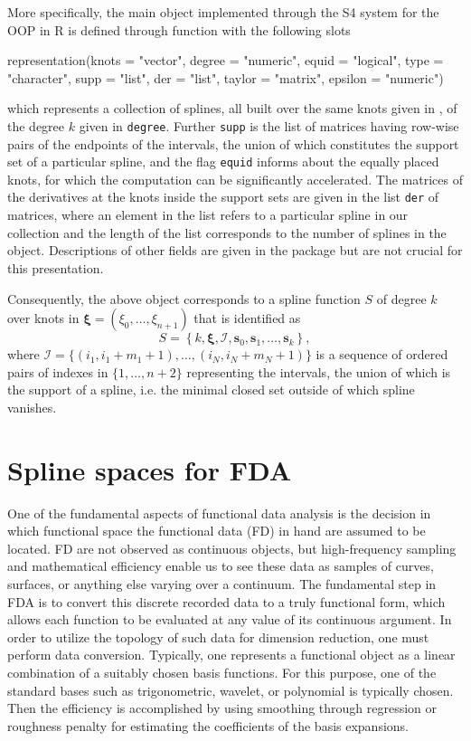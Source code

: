 More specifically, the main object  implemented through the S4 system for the OOP in R is defined through  function with the following slots


\begin{example}
representation(knots = "vector", degree = "numeric", equid = "logical", type =
    "character", supp = "list", der = "list", taylor = "matrix", epsilon = "numeric")
\end{example}


\noindent which represents a collection of splines,  all built over the same knots given in , of the {  degree}  $k$ given in {\tt degree}.
Further {\tt supp}  is the list of matrices having row-wise pairs of the endpoints of the intervals, the union of which constitutes the support set of a particular spline,  and the flag {\tt equid} informs about the equally placed knots, for which the computation can be significantly accelerated. 
The matrices of the derivatives at the knots inside the support sets are given in the list {\tt der} of 
 matrices, where an element in the list refers to a particular spline in our collection and the length of the list corresponds to the number of splines in the object.  
Descriptions of other fields are given in the  package but are not crucial for this presentation.

Consequently, the above object corresponds to a spline function $S$ of {  degree}  $k$ over knots in $\boldsymbol \xi=(\xi_0,\dots, \xi_{n+1})$ that is identified as 
$$
S=\left\{k, \boldsymbol \xi,\mathcal I, \mathbf s_0,\mathbf s_1, \dots, \mathbf s_k\right\},
$$
where $\mathcal I=\{(i_1, i_1+m_1+1), \dots,(i_ N,i_N+m_N+1) \}$ is a sequence of ordered pairs of indexes in $\{1,\dots,n+2\}$ representing the intervals, the union of which is the support of a spline, i.e. the minimal closed set outside  of which spline vanishes.

\vspace{-.13cm}
\section{Spline spaces for FDA}
\vspace{-.22cm}
One of the fundamental aspects of functional data analysis is the decision in which functional space the functional data (FD) in hand are assumed to be located. 
FD are not observed as continuous objects, but high-frequency sampling and mathematical efficiency enable us to
see these data as samples of curves, surfaces, or anything else varying over a continuum. The fundamental step in FDA
is to convert this discrete recorded data to a truly functional form, which allows each function to be evaluated at any
value of its continuous argument. In order to utilize the topology of such data for dimension reduction, one must perform
data conversion. Typically, one represents a functional object as a linear combination of a suitably chosen basis functions. 
For this purpose, one of the standard bases such as trigonometric, wavelet, or polynomial is typically chosen. 
Then the efficiency is accomplished by using smoothing through regression or roughness penalty for estimating the coefficients of the basis expansions. 

